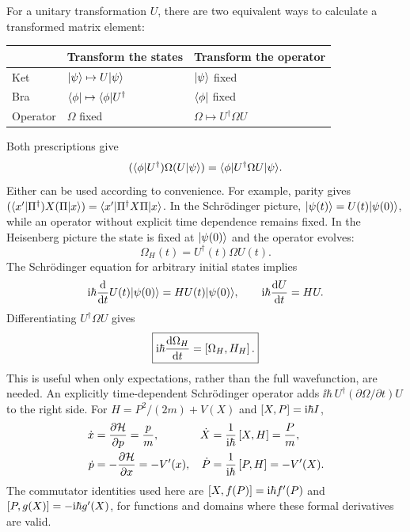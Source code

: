 For a unitary transformation $U$, there are two equivalent ways to
calculate a transformed matrix element:
\begin{center}
\begin{tabular}{lll}
\toprule
 & Transform the states & Transform the operator\\
\midrule
Ket & $\lvert \psi\rangle\mapsto U\lvert \psi\rangle$ & $\lvert \psi\rangle$ fixed\\
Bra & $\langle \phi\rvert\mapsto\langle \phi\rvert U^\dagger$ & $\langle \phi\rvert$ fixed\\
Operator & $\Omega$ fixed & $\Omega\mapsto U^\dagger\Omega U$\\
\bottomrule
\end{tabular}
\end{center}
Both prescriptions give
\[
 (\langle \phi\rvert U^\dagger)\Omega(U\lvert \psi\rangle)
 =\langle \phi\rvert U^\dagger\Omega U\lvert \psi\rangle.
\]
Either can be used according to convenience. For example, parity gives
$(\langle x'\rvert\Pi^\dagger)X(\Pi\lvert x\rangle)=\langle x'\rvert \Pi^\dagger X\Pi\lvert x\rangle$.
In the Schr\"odinger picture,
$\lvert \psi(t)\rangle=U(t)\lvert \psi(0)\rangle$, while an operator without explicit
time dependence remains fixed. In the Heisenberg picture the state is
fixed at $\lvert \psi(0)\rangle$ and the operator evolves:
\[
 \Omega_H(t)=U^\dagger(t)\Omega U(t).
\]
The Schr\"odinger equation for arbitrary initial states implies
\[
 \mathrm{i}\hbar\frac{\mathop{}\!\mathrm{d}}{\mathop{}\!\mathrm{d} t}U(t)\lvert \psi(0)\rangle
 =HU(t)\lvert \psi(0)\rangle,\qquad
 \mathrm{i}\hbar\frac{\mathop{}\!\mathrm{d} U}{\mathop{}\!\mathrm{d} t}=HU.
\]
Differentiating $U^\dagger\Omega U$ gives
\[
 \boxed{\mathrm{i}\hbar\frac{\mathop{}\!\mathrm{d}\Omega_H}{\mathop{}\!\mathrm{d} t}
 =\left[\Omega_H,H_H\right].}
\]
This is useful when only expectations, rather than the full wavefunction,
are needed. An explicitly time-dependent Schr\"odinger operator adds
$\ii\hbar\,U^\dagger(\partial\Omega/\partial t)U$ to the right side.
For $H=P^2/(2m)+V(X)$ and $\left[X,P\right]=\mathrm{i}\hbar I$,
\begin{align*}
 \dot x&=\frac{\partial\mathcal H}{\partial p}=\frac pm,
 &\dot X&=\frac1{\mathrm{i}\hbar}\left[X,H\right]=\frac Pm,\\
 \dot p&=-\frac{\partial\mathcal H}{\partial x}=-V'(x),
 &\dot P&=\frac1{\mathrm{i}\hbar}\left[P,H\right]=-V'(X).
\end{align*}
The commutator identities used here are
$\left[X,f(P)\right]=\mathrm{i}\hbar f'(P)$ and $\left[P,g(X)\right]=-\mathrm{i}\hbar g'(X)$,
for functions and domains where these formal derivatives are valid.
